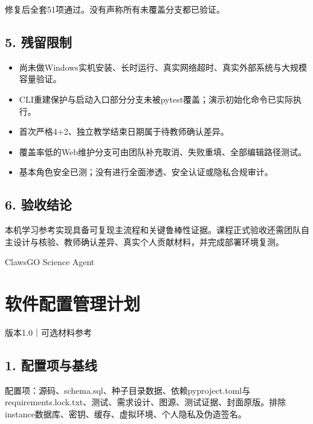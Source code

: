 \documentclass[UTF8,11pt,a4paper]{ctexart}
\providecommand{\tightlist}{\setlength{\itemsep}{0pt}\setlength{\parskip}{0pt}}
\begin{document}
修复后全套51项通过。没有声称所有未覆盖分支都已验证。

\hypertarget{5-ux6b8bux7559ux9650ux5236}{%
\subsection{5. 残留限制}\label{5-ux6b8bux7559ux9650ux5236}}

\begin{itemize}
\tightlist
\item
  尚未做Windows实机安装、长时运行、真实网络超时、真实外部系统与大规模容量验证。
\item
  CLI重建保护与启动入口部分分支未被pytest覆盖；演示初始化命令已实际执行。
\item
  首次严格4+2、独立教学结束日期属于待教师确认差异。
\item
  覆盖率低的Web维护分支可由团队补充取消、失败重填、全部编辑路径测试。
\item
  基本角色安全已测；没有进行全面渗透、安全认证或隐私合规审计。
\end{itemize}

\hypertarget{6-ux9a8cux6536ux7ed3ux8bba}{%
\subsection{6. 验收结论}\label{6-ux9a8cux6536ux7ed3ux8bba}}

本机学习参考实现具备可复现主流程和关键鲁棒性证据。课程正式验收还需团队自主设计与核验、教师确认差异、真实个人贡献材料，并完成部署环境复测。

ClawsGO Science Agent

\clearpage
\hypertarget{ux8f6fux4ef6ux914dux7f6eux7ba1ux7406ux8ba1ux5212}{%
\section{软件配置管理计划}\label{ux8f6fux4ef6ux914dux7f6eux7ba1ux7406ux8ba1ux5212}}

版本1.0｜可选材料参考

\hypertarget{1-ux914dux7f6eux9879ux4e0eux57faux7ebf}{%
\subsection{1.
配置项与基线}\label{1-ux914dux7f6eux9879ux4e0eux57faux7ebf}}

配置项：源码、schema.sql、种子目录数据、依赖pyproject.toml与requirements.lock.txt、测试、需求设计、图源、测试证据、封面原版。排除instance数据库、密钥、缓存、虚拟环境、个人隐私及伪造签名。
\end{document}
